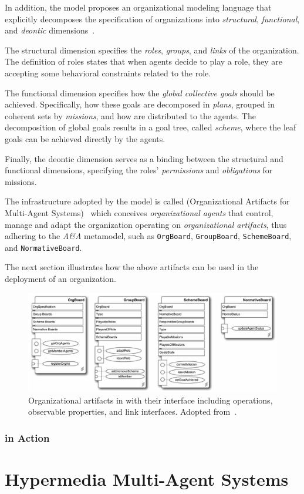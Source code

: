 In addition, the \moiseplus{} model proposes an organizational modeling language that explicitly decomposes the specification of organizations into \textit{structural}, \textit{functional}, and \textit{deontic} dimensions~\cite{doi:10.1504/IJAOSE.2007.016266}\cite{10.1145/544741.544858}.

The structural dimension specifies the \textit{roles}, \textit{groups}, and \textit{links} of the organization.
The definition of roles states that when agents decide to play a role, they are accepting some behavioral constraints related to the role.

The functional dimension specifies how the \textit{global collective goals} should be achieved.
Specifically, how these goals are decomposed in \textit{plans}, grouped in coherent sets by \textit{missions}, and how are distributed to the agents.
The decomposition of global goals results in a goal tree, called \textit{scheme}, where the leaf goals can be achieved directly by the agents.

Finally, the deontic dimension serves as a binding between the structural and functional dimensions, specifying the roles' \textit{permissions} and \textit{obligations} for missions.

The infrastructure adopted by the \moiseplus{} model is called \oraformas{} (Organizational Artifacts for Multi-Agent Systems)~\cite{hubner2010} which conceives \textit{organizational agents} that control, manage and adapt the organization operating on \textit{organizational artifacts}, thus adhering to the \textit{A\&A} metamodel, such as \texttt{OrgBoard}, \texttt{GroupBoard}, \texttt{SchemeBoard}, and \texttt{NormativeBoard}.

The next section illustrates how the above artifacts can be used in the deployment of an organization.

\begin{figure}[H]
    \centering
    \includegraphics[width=\linewidth]{images/org-artifacts.png}
    \caption{Organizational artifacts in \oraformas{} with their interface including operations, observable properties, and link interfaces. Adopted from~\cite{hubner2010}.}
    \label{fig:org-artifacts}
\end{figure}

\subsubsection{\oraformas{} in Action}

\section{Hypermedia Multi-Agent Systems}
